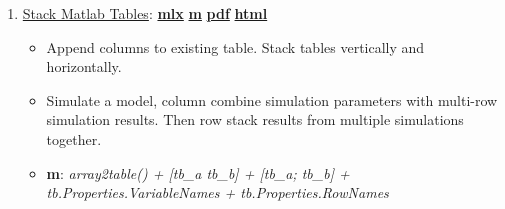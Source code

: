\documentclass[
]{book}
\providecommand{\tightlist}{%
  \setlength{\itemsep}{0pt}\setlength{\parskip}{0pt}}
\begin{document}
\begin{enumerate}
\def\labelenumi{\arabic{enumi}.}
\tightlist
\item
  \href{https://fanwangecon.github.io/M4Econ/table/join/htmlpdfm/fs_tab_stack.html}{Stack Matlab Tables}: \href{https://github.com/FanWangEcon/M4Econ/blob/master/table/join/fs_tab_stack.mlx}{\textbf{mlx}} \textbar{} \href{https://github.com/FanWangEcon/M4Econ/blob/master/table/join/htmlpdfm/fs_tab_stack.m}{\textbf{m}} \textbar{} \href{https://github.com/FanWangEcon/M4Econ/blob/master/table/join/htmlpdfm/fs_tab_stack.pdf}{\textbf{pdf}} \textbar{} \href{https://fanwangecon.github.io/M4Econ/table/join/htmlpdfm/fs_tab_stack.html}{\textbf{html}}

  \begin{itemize}
  \tightlist
  \item
    Append columns to existing table. Stack tables vertically and horizontally.
  \item
    Simulate a model, column combine simulation parameters with multi-row simulation results. Then row stack results from multiple simulations together.
  \item
    \textbf{m}: \emph{array2table() + {[}tb\_a tb\_b{]} + {[}tb\_a; tb\_b{]} + tb.Properties.VariableNames + tb.Properties.RowNames}
  \end{itemize}
\end{enumerate}

  
\end{document}

